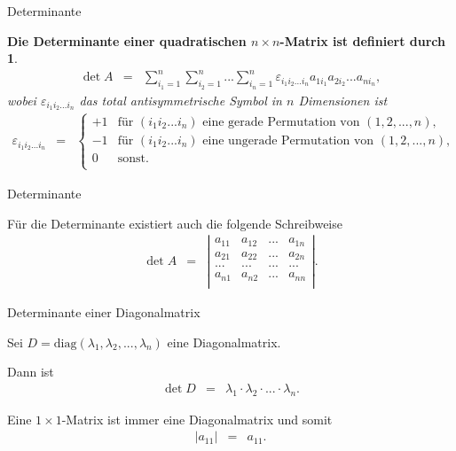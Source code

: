 \documentclass[german]{beamer}
\newcommand{\bq}{\begin{eqnarray*}}
\newcommand{\eq}{\end{eqnarray*}}
\newcommand{\eps}{\varepsilon}
\newtheorem*{mytheorem16}{Die Determinante einer quadratischen $n \times n$-Matrix ist definiert durch}
\begin{document}
\begin{frame}{Determinante}

\begin{mytheorem16}
\bq
 \det A & = & 
 \sum\limits_{i_1=1}^n \sum\limits_{i_2=1}^n ... \sum\limits_{i_n=1}^n
 \eps_{i_1 i_2 ... i_n} a_{1i_1} a_{2i_2} ... a_{ni_n},
\eq
wobei $\eps_{i_1 i_2 ... i_n}$ das total antisymmetrische Symbol in $n$ Dimensionen ist
{\footnotesize
\bq
 \eps_{i_1 i_2 ... i_n} & = & \left\{
 \begin{array}{rl}
   +1 & \mbox{f\"ur $(i_1 i_2 ... i_n)$ eine gerade Permutation von $(1,2,...,n)$,} \\
   -1 & \mbox{f\"ur $(i_1 i_2 ... i_n)$ eine ungerade Permutation von $(1,2,...,n)$,} \\
   0 & \mbox{sonst}. \\
 \end{array}
\right.
\eq
}
\end{mytheorem16}

\end{frame}

\begin{frame}{Determinante}

F\"ur die Determinante existiert auch die folgende Schreibweise
\bq
 \det A & = & 
\left| \begin{array}{cccc}
 a_{11} & a_{12} & ... & a_{1n} \\
 a_{21} & a_{22} & ... & a_{2n} \\
 ...    & ...    & ... & ...    \\
 a_{n1} & a_{n2} & ... & a_{nn} \\
\end{array} \right|.
\eq

\end{frame}

\begin{frame}{Determinante einer Diagonalmatrix}

Sei $D=\mbox{diag}(\lambda_1, \lambda_2, ..., \lambda_n)$ eine Diagonalmatrix.

\vspace*{5mm} 

Dann ist
\bq
 \det D & = & \lambda_1 \cdot \lambda_2 \cdot ... \cdot \lambda_n.
\eq

\vspace*{10mm}

Eine $1 \times 1$-Matrix ist immer eine Diagonalmatrix und somit
\bq
 \left| a_{11} \right| & = & a_{11}.
\eq

\end{frame}
\end{document}
